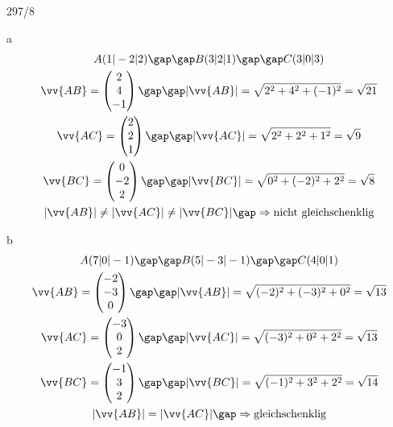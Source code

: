 \begin{exercise}{297/8}
  \item [a]
  \begin{gather*}
    A(1|-2|2) \gap\gap B(3|2|1) \gap\gap C(3|0|3) \\
    \vv{AB} = \begin{pmatrix}2 \\ 4 \\ -1\end{pmatrix} \gap\gap |\vv{AB}| = \sqrt{2^2 + 4^2 + (-1)^2} = \sqrt{21} \\
    \vv{AC} = \begin{pmatrix}2 \\ 2 \\ 1\end{pmatrix} \gap\gap |\vv{AC}| = \sqrt{2^2 + 2^2 + 1^2} = \sqrt{9} \\
    \vv{BC} = \begin{pmatrix}0 \\ -2 \\ 2\end{pmatrix} \gap\gap |\vv{BC}| = \sqrt{0^2 + (-2)^2 + 2^2} = \sqrt{8} \\
    |\vv{AB}| \neq |\vv{AC}| \neq |\vv{BC}| \gap\Rightarrow\text{nicht gleichschenklig}
  \end{gather*}
  \item [b]
  \begin{gather*}
    A(7|0|-1) \gap\gap B(5|-3|-1) \gap\gap C(4|0|1) \\
    \vv{AB} = \begin{pmatrix}-2 \\ -3 \\ 0\end{pmatrix} \gap\gap |\vv{AB}| = \sqrt{(-2)^2 + (-3)^2 + 0^2} = \sqrt{13} \\
    \vv{AC} = \begin{pmatrix}-3 \\ 0 \\ 2\end{pmatrix} \gap\gap |\vv{AC}| = \sqrt{(-3)^2 + 0^2 + 2^2} = \sqrt{13} \\
    \vv{BC} = \begin{pmatrix}-1 \\ 3 \\ 2\end{pmatrix} \gap\gap |\vv{BC}| = \sqrt{(-1)^2 + 3^2 + 2^2} = \sqrt{14} \\
    |\vv{AB}| = |\vv{AC}| \gap\Rightarrow\text{gleichschenklig}
  \end{gather*}
\end{exercise}

